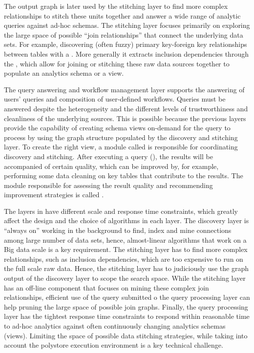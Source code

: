 The output graph is later used by the stitching layer to find more complex
relationships to stitch these units together and answer a wide range of
analytic queries against ad-hoc schemas. The stitching layer focuses primarily on
exploring the large space of possible ``join relationships'' that connect the
underlying data sets. For example, discovering (often fuzzy) primary key-foreign
key relationships between tables with a . More
generally it extracts inclusion dependencies through the ,
which allow for joining or stitching these raw data sources together to populate
an analytics schema or a view. 

The query answering and workflow management layer 
supports the answering of users' queries and composition of user-defined workflows.
Queries must be answered despite the heterogeneity and the different levels of
trustworthiness and cleanliness of the underlying sources. This is possible
because the previous layers provide the capability of creating schema views
on-demand for the query to process by using the graph structure populated by
the discovery and stitching layer. To create the right view, a module
called  is responsible for coordinating discovery
and stitching. After executing a query (), the results will
be accompanied of certain quality, which can be improved by, for example,
performing some data cleaning on key tables that contribute to the results. The
module responsible for assessing the result quality and recommending improvement
strategies is called .

The  layers in \dcv have different scale and response time constraints,
which greatly affect the design and the choice of algorithms in each layer. 
The discovery layer is ``always on'' working in the background to find, index and
mine connections among large number of data sets, hence, almost-linear
algorithms that work on a Big data scale is a key requirement. 
The stitching layer has to find more complex
relationships, such as inclusion dependencies, which are too expensive to run on
the full scale raw data. Hence, the stitching layer has to judiciously use the
graph output of the discovery layer to scope the search space. While the stitching
layer has an off-line component that focuses on mining these complex join
relationships, efficient use of the query submitted o the query processing layer
can help pruning the large space of possible join graphs. 
Finally, the query processing layer has the tightest response time constraints to respond
within reasonable time to ad-hoc analytics against often continuously changing
analytics schemas (views). Limiting the space of possible data stitching
strategies, while taking into account the polystore execution environment is a
key technical challenge. 

